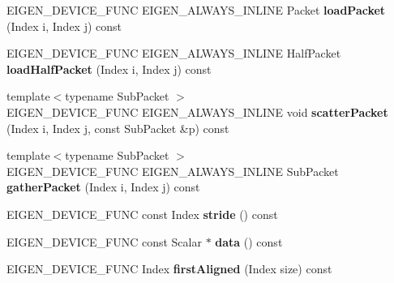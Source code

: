 \begin{DoxyCompactItemize}
\item 
\mbox{\label{class_eigen_1_1internal_1_1blas__data__mapper_ad82c65c2daa3e60f0ab6d96eab37b4f8}} 
E\+I\+G\+E\+N\+\_\+\+D\+E\+V\+I\+C\+E\+\_\+\+F\+U\+NC E\+I\+G\+E\+N\+\_\+\+A\+L\+W\+A\+Y\+S\+\_\+\+I\+N\+L\+I\+NE Packet {\bfseries load\+Packet} (Index i, Index j) const
\item 
\mbox{\label{class_eigen_1_1internal_1_1blas__data__mapper_ab20e83fe585195cf86f2f4f46409a186}} 
E\+I\+G\+E\+N\+\_\+\+D\+E\+V\+I\+C\+E\+\_\+\+F\+U\+NC E\+I\+G\+E\+N\+\_\+\+A\+L\+W\+A\+Y\+S\+\_\+\+I\+N\+L\+I\+NE Half\+Packet {\bfseries load\+Half\+Packet} (Index i, Index j) const
\item 
\mbox{\label{class_eigen_1_1internal_1_1blas__data__mapper_a026a62809b2eff9e14ccc8c22b26e5f0}} 
{\footnotesize template$<$typename Sub\+Packet $>$ }\\E\+I\+G\+E\+N\+\_\+\+D\+E\+V\+I\+C\+E\+\_\+\+F\+U\+NC E\+I\+G\+E\+N\+\_\+\+A\+L\+W\+A\+Y\+S\+\_\+\+I\+N\+L\+I\+NE void {\bfseries scatter\+Packet} (Index i, Index j, const Sub\+Packet \&p) const
\item 
\mbox{\label{class_eigen_1_1internal_1_1blas__data__mapper_ae947afd5dceca7c8f1d5c5f054e2ffcf}} 
{\footnotesize template$<$typename Sub\+Packet $>$ }\\E\+I\+G\+E\+N\+\_\+\+D\+E\+V\+I\+C\+E\+\_\+\+F\+U\+NC E\+I\+G\+E\+N\+\_\+\+A\+L\+W\+A\+Y\+S\+\_\+\+I\+N\+L\+I\+NE Sub\+Packet {\bfseries gather\+Packet} (Index i, Index j) const
\item 
\mbox{\label{class_eigen_1_1internal_1_1blas__data__mapper_a3303085bf92397158e10f0c9fd217754}} 
E\+I\+G\+E\+N\+\_\+\+D\+E\+V\+I\+C\+E\+\_\+\+F\+U\+NC const Index {\bfseries stride} () const
\item 
\mbox{\label{class_eigen_1_1internal_1_1blas__data__mapper_a772b5c873d654e3937f244722bd20bb3}} 
E\+I\+G\+E\+N\+\_\+\+D\+E\+V\+I\+C\+E\+\_\+\+F\+U\+NC const Scalar $\ast$ {\bfseries data} () const
\item 
\mbox{\label{class_eigen_1_1internal_1_1blas__data__mapper_a45b684d956b18a77fa5a1e4d84e7cd26}} 
E\+I\+G\+E\+N\+\_\+\+D\+E\+V\+I\+C\+E\+\_\+\+F\+U\+NC Index {\bfseries first\+Aligned} (Index size) const
\end{DoxyCompactItemize}
